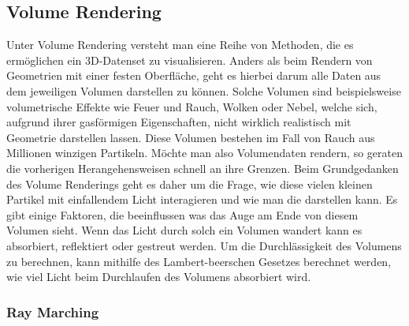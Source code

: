 \newpage
\subsection{Volume Rendering}

Unter Volume Rendering versteht man eine Reihe von Methoden, die es ermöglichen ein 3D-Datenset zu visualisieren. 
Anders als beim Rendern von Geometrien mit einer festen Oberfläche, geht es hierbei darum alle Daten aus 
dem jeweiligen Volumen darstellen zu können. Solche Volumen sind beispielsweise volumetrische Effekte wie Feuer und Rauch, Wolken oder Nebel, 
welche sich, aufgrund ihrer gasförmigen Eigenschaften, nicht wirklich realistisch mit Geometrie darstellen lassen. 
Diese Volumen bestehen im Fall von Rauch aus Millionen winzigen Partikeln. 
Möchte man also Volumendaten rendern, so geraten die vorherigen Herangehensweisen schnell an ihre Grenzen.
Beim Grundgedanken des Volume Renderings geht es daher um die Frage, wie diese vielen kleinen Partikel mit einfallendem Licht interagieren
und wie man die darstellen kann. 
Es gibt einige Faktoren, die beeinflussen was das Auge am Ende von diesem Volumen sieht. Wenn das Licht durch solch ein Volumen wandert 
kann es absorbiert, reflektiert oder gestreut werden. 
Um die Durchlässigkeit des Volumens zu berechnen, kann mithilfe des Lambert-beerschen Gesetzes berechnet werden, wie viel Licht beim 
Durchlaufen des Volumens absorbiert wird. 




\subsubsection{Ray Marching}

